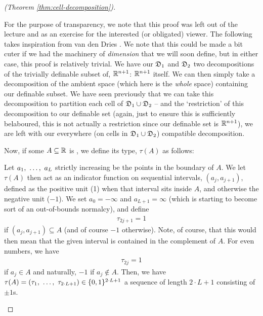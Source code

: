 \begin{proof}[\CD (Theorem \ref{thm:cell-decomposition})]
  \begin{subproof}
    For the purpose of transparency, we note that this proof was left out of the lecture and as an exercise for the interested (or obligated) viewer. The following takes inspiration from van den Dries \cite{dries_tame_1998}. We note that this could be made a bit cuter if we had the machinery of \emph{dimension} that we will soon define, but in either case, this proof is relatively trivial. We have our $\mathfrak{D}_1$ and $\mathfrak{D}_2$ two decompositions of the trivially definable subset of, $\mathbb{R}^{n+1}$: $\mathbb{R}^{n+1}$ itself. We can then simply take a decomposition of the ambient space (which here is the \emph{whole} space) containing our definable subset. We have seen previously that we can take this decomposition to partition each cell of $\mathfrak{D}_1 \cup \mathfrak{D}_2$ -- and the `restriction' of this decomposition to our definable set (again, just to ensure this is sufficiently belaboured, this is not actually a restriction since our definable set is $\mathbb{R}^{n+1}$), we are left with our everywhere (on cells in $\mathfrak{D}_1 \cup \mathfrak{D}_2$) compatible decomposition.
    \smartqed
  \end{subproof}


  Now, if some $A \subseteq \mathbb{R}$ is , we define its type, $\tau(A)$ as follows:
  \begin{description}
    \item Let $a_1, \ \hdots, \ a_{L}$ strictly increasing be the points in the boundary of $A$. We let $\tau(A)$ then act as an indicator function on sequential intervals, $(a_j, a_{j+1})$, defined as the positive unit (1) when that interval sits inside $A$, and otherwise the negative unit ($-1$). We set $a_0 = - \infty$ and $a_{L+1} = \infty$ (which is starting to become sort of an out-of-bounds normalcy), and define
    \begin{align*}
      \tau_{2j + 1} = 1
    \end{align*}
    if $(a_j, a_{j+1}) \subseteq A$ (and of course $-1$ otherwise). Note, of course, that this would then mean that the given interval is contained in the complement of $A$. For even numbers, we have
    \begin{align*}
      \tau_{2j} = 1
    \end{align*}
    if $a_j \in A$ and naturally, $-1$ if $a_j \not\in A$. Then, we have $\tau(A) = (\tau_1, \ \hdots, \ \tau_{2 \cdot L + 1}) \in \{0, 1\}^{2 \cdot L + 1}$ a sequence of length $2 \cdot L + 1$ consisting of $\pm 1$s.


\end{description}
\end{proof}
